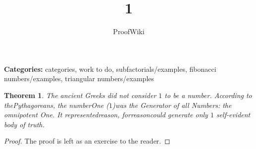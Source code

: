 \documentclass{article}
\title{1}
\author{ProofWiki}
\date{}
\newtheorem{theorem}{Theorem}
\begin{document}
\maketitle

\noindent\textbf{Categories:} categories, work to do, subfactorials/examples, fibonacci numbers/examples, triangular numbers/examples

\begin{theorem}
The ancient Greeks did not consider $1$ to be a number. According to thePythagoreans, the numberOne ($1$)was the Generator of all Numbers: the omnipotent One. It representedreason, forreasoncould generate only $1$ self-evident body of truth.
\end{theorem}

\begin{proof}
The proof is left as an exercise to the reader.
\end{proof}
\end{document}
